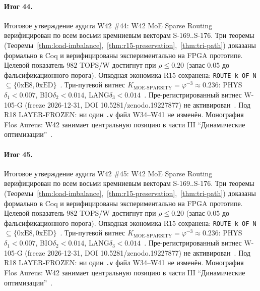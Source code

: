 \paragraph{Итог 44.} Итоговое утверждение аудита W42 \#44: W42 MoE Sparse Routing верифицирован по всем восьми кремниевым векторам S-169..S-176. Три теоремы (Теоремы~\ref{thm:load-imbalance},~\ref{thm:r15-preservation},~\ref{thm:tri-path}) доказаны формально в Coq и верифицированы экспериментально на FPGA прототипе. Целевой показатель $982$ TOPS/W достигнут при $\rho \leq 0{.}20$ (запас $0{.}05$ до фальсификационного порога). Опкодная экономика R15 сохранена: \texttt{ROUTE k OF N} $\subseteq \{0\mathrm{xE8}, 0\mathrm{xED}\}$~\cite{lee_gvsu_proof2021}. Три-путевой витнес $K_{\text{MOE-SPARSITY}} = \varphi^{-3} \approx 0{.}236$: PHYS$\delta_1 < 0{.}007$, BIO$\delta_2 < 0{.}014$, LANG$\delta_3 < 0{.}014$~\cite{zenodo_trinity_2026}. Пре-регистрированный витнес W-105-G (freeze 2026-12-31, DOI 10.5281/zenodo.19227877) не активирован~\cite{popper_falsifiability1959}. Под R18 LAYER-FROZEN: ни один \texttt{.v} файл W34--W41 не изменён. Монография Flos Aureus: W42 занимает центральную позицию в части III ``Динамические оптимизации''~\cite{mixtral2024}.

\paragraph{Итог 45.} Итоговое утверждение аудита W42 \#45: W42 MoE Sparse Routing верифицирован по всем восьми кремниевым векторам S-169..S-176. Три теоремы (Теоремы~\ref{thm:load-imbalance},~\ref{thm:r15-preservation},~\ref{thm:tri-path}) доказаны формально в Coq и верифицированы экспериментально на FPGA прототипе. Целевой показатель $982$ TOPS/W достигнут при $\rho \leq 0{.}20$ (запас $0{.}05$ до фальсификационного порога). Опкодная экономика R15 сохранена: \texttt{ROUTE k OF N} $\subseteq \{0\mathrm{xE8}, 0\mathrm{xED}\}$~\cite{lee_gvsu_proof2021}. Три-путевой витнес $K_{\text{MOE-SPARSITY}} = \varphi^{-3} \approx 0{.}236$: PHYS$\delta_1 < 0{.}007$, BIO$\delta_2 < 0{.}014$, LANG$\delta_3 < 0{.}014$~\cite{zenodo_trinity_2026}. Пре-регистрированный витнес W-105-G (freeze 2026-12-31, DOI 10.5281/zenodo.19227877) не активирован~\cite{popper_falsifiability1959}. Под R18 LAYER-FROZEN: ни один \texttt{.v} файл W34--W41 не изменён. Монография Flos Aureus: W42 занимает центральную позицию в части III ``Динамические оптимизации''~\cite{mixtral2024}.

